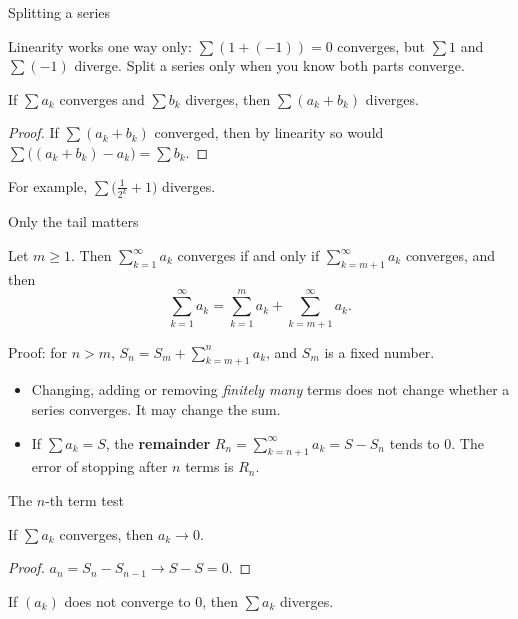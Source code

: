 \documentclass{wosm-slides}
\begin{document}
\begin{frame}{Splitting a series}
  \begin{warning}
    Linearity works one way only: $\sum (1 + (-1)) = 0$ converges, but $\sum 1$ and
    $\sum (-1)$ diverge. Split a series only when you know both parts converge.
  \end{warning}
  \pause
  \begin{corollary}
    If $\sum a_k$ converges and $\sum b_k$ diverges, then $\sum (a_k + b_k)$ diverges.
  \end{corollary}
  \begin{proof}
    If $\sum (a_k + b_k)$ converged, then by linearity so would
    $\sum \bigl((a_k + b_k) - a_k\bigr) = \sum b_k$.
  \end{proof}
  For example, $\sum \bigl(\frac1{2^k} + 1\bigr)$ diverges.
\end{frame}

\begin{frame}{Only the tail matters}
  \begin{theorem}
    Let $m \ge 1$. Then $\sum_{k=1}^\infty a_k$ converges if and only if
    $\sum_{k=m+1}^\infty a_k$ converges, and then
    \[ \sum_{k=1}^\infty a_k = \sum_{k=1}^{m} a_k + \sum_{k=m+1}^\infty a_k . \]
  \end{theorem}
  {\small Proof: for $n > m$, $S_n = S_m + \sum_{k=m+1}^{n} a_k$, and $S_m$ is a fixed number.\par}
  \pause
  \begin{itemize}
    \item Changing, adding or removing \emph{finitely many} terms does not change
      whether a series converges. It may change the sum.
    \item If $\sum a_k = S$, the \textbf{remainder}
      $R_n = \sum_{k=n+1}^\infty a_k = S - S_n$ tends to $0$.
      The error of stopping after $n$ terms is $R_n$.
  \end{itemize}
\end{frame}

\begin{frame}{The $n$-th term test}
  \begin{theorem}
    If $\sum a_k$ converges, then $a_k \to 0$.
  \end{theorem}
  \begin{proof}
    $a_n = S_n - S_{n-1} \to S - S = 0$.
  \end{proof}
  \pause
  \begin{corollary}
    If $(a_k)$ does not converge to $0$, then $\sum a_k$ diverges.
  \end{corollary}
\end{frame}
\end{document}
